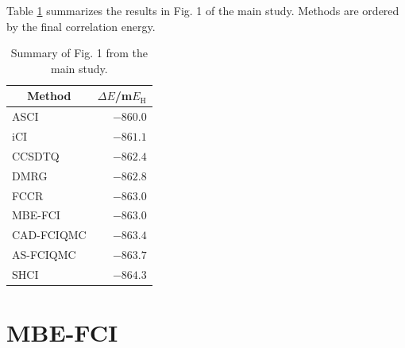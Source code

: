 \documentclass[journal=jcp,manuscript=suppinfo]{achemso}
\begin{document}
Table \ref{results_SI_table} summarizes the results in Fig. 1 of the main study. Methods are ordered by the final correlation energy.
%
\begin{table}[ht]
\begin{center}
\caption{Summary of Fig. 1 from the main study.}
\label{results_SI_table}
\begin{tabular}{l|r}
\toprule
\multicolumn{1}{c|}{Method} & \multicolumn{1}{c}{$\Delta E$/m$E_{\text{H}}$} \\
\midrule\midrule
ASCI & $-860.0$ \\
iCI & $-861.1$ \\
CCSDTQ & $-862.4$ \\
DMRG & $-862.8$ \\
FCCR & $-863.0$ \\
MBE-FCI & $-863.0$ \\
CAD-FCIQMC & $-863.4$ \\
AS-FCIQMC & $-863.7$ \\
SHCI & $-864.3$ \\
\midrule
\end{tabular}
\vspace{-1.4cm}
\end{center}
\end{table}
%

\section{MBE-FCI}
\end{document}

